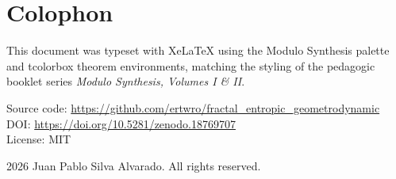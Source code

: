 \documentclass[11pt, a4paper, openany]{book}
\begin{document}
\backmatter

\chapter*{Colophon}

This document was typeset with XeLaTeX using the Modulo Synthesis palette
and tcolorbox theorem environments, matching the styling of the pedagogic
booklet series \emph{Modulo Synthesis, Volumes I \& II}.

\medskip\noindent
Source code: \url{https://github.com/ertwro/fractal_entropic_geometrodynamic}\\
DOI: \url{https://doi.org/10.5281/zenodo.18769707}\\
License: MIT

\medskip\noindent
\textcopyright{} 2026 Juan Pablo Silva Alvarado.  All rights reserved.
\end{document}
